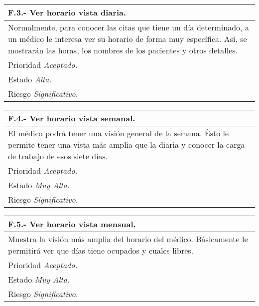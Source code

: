\documentclass[a4paper,oneside,11pt]{book}
\begin{document}
\begin{center}
\begin{tabulary}{15cm}{|L|}
	\hline
		\bf{F.3.- Ver horario vista diaria.} \\
	\hline
		Normalmente, para conocer las citas que tiene un día determinado, a un médico le interesa ver su horario de forma muy específica. Así, se mostrarán las horas, los nombres de los pacientes y otros detalles. \\
	\hline
		Prioridad \textit{Aceptado.} \\
	\hline
		Estado \textit{Alta.} \\
	\hline
		Riesgo \textit{Significativo.} \\
	\hline
\end{tabulary}
\end{center}

\begin{center}
\begin{tabulary}{15cm}{|L|}
	\hline
		\bf{F.4.- Ver horario vista semanal.} \\
	\hline
		El médico podrá tener una visión general de la semana. Ésto le permite tener una vista más amplia que la diaria y conocer la carga de trabajo de esos siete días. \\
	\hline
		Prioridad \textit{Aceptado.} \\
	\hline
		Estado \textit{Muy Alta.} \\
	\hline
		Riesgo \textit{Significativo.} \\
	\hline
\end{tabulary}
\end{center}

\begin{center}
\begin{tabulary}{15cm}{|L|}
	\hline
		\bf{F.5.- Ver horario vista mensual.} \\
	\hline
		Muestra la visión más amplia del horario del médico. Básicamente le permitirá ver que días tiene ocupados y cuales libres. \\
	\hline
		Prioridad \textit{Aceptado.} \\
	\hline
		Estado \textit{Muy Alta.} \\
	\hline
		Riesgo \textit{Significativo.} \\
	\hline
\end{tabulary}
\end{center}
\end{document}
